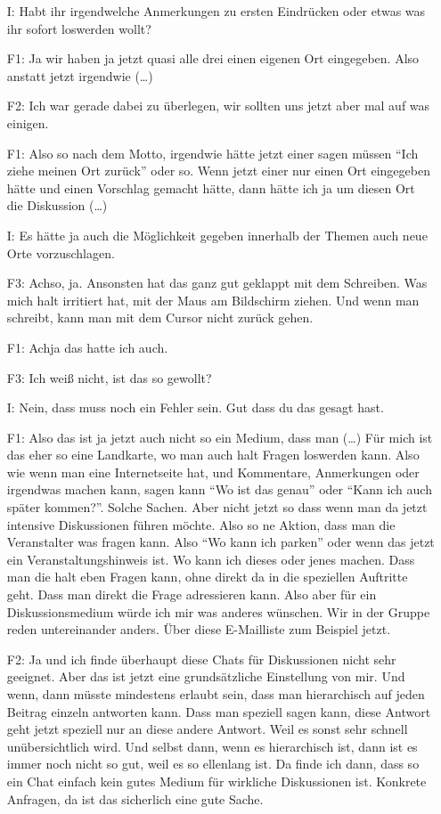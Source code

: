 \begin{itemize}
    \item[I:] Habt ihr irgendwelche Anmerkungen zu ersten Eindrücken oder etwas was ihr sofort loswerden wollt?
    \item[F1:] Ja wir haben ja jetzt quasi alle drei einen eigenen Ort eingegeben. Also anstatt jetzt irgendwie (\dots)
    \item[F2:] Ich war gerade dabei zu überlegen, wir sollten uns jetzt aber mal auf was einigen.
    \item[F1:] Also so nach dem Motto, irgendwie hätte jetzt einer sagen müssen "`Ich ziehe meinen Ort zurück"' oder so. Wenn jetzt einer nur einen Ort eingegeben hätte und einen Vorschlag gemacht hätte, dann hätte ich ja um diesen Ort die Diskussion (\dots)
    \item[I:] Es hätte ja auch die Möglichkeit gegeben innerhalb der Themen auch neue Orte vorzuschlagen.
    \item[F3:] Achso, ja. Ansonsten hat das ganz gut geklappt mit dem Schreiben. Was mich halt irritiert hat, mit der Maus am Bildschirm ziehen. Und wenn man schreibt, kann man mit dem Cursor nicht zurück gehen.
    \item[F1:] Achja das hatte ich auch.
    \item[F3:] Ich weiß nicht, ist das so gewollt?
    \item[I:] Nein, dass muss noch ein Fehler sein. Gut dass du das gesagt hast.
    \item[F1:] Also das ist ja jetzt auch nicht so ein Medium, dass man (\dots) Für mich ist das eher so eine Landkarte, wo man auch halt Fragen loswerden kann. Also wie wenn man eine Internetseite hat, und Kommentare, Anmerkungen oder irgendwas machen kann, sagen kann "`Wo ist das genau"' oder "`Kann ich auch später kommen?"'. Solche Sachen. Aber nicht jetzt so dass wenn man da jetzt intensive Diskussionen führen möchte. Also so ne Aktion, dass man die Veranstalter was fragen kann. Also "`Wo kann ich parken"' oder wenn das jetzt ein Veranstaltungshinweis ist. Wo kann ich dieses oder jenes machen. Dass man die halt eben Fragen kann, ohne direkt da in die speziellen Auftritte geht. Dass man direkt die Frage adressieren kann. Also aber für ein Diskussionsmedium würde ich mir was anderes wünschen. Wir in der Gruppe reden untereinander anders. {\"U}ber diese E-Mailliste zum Beispiel jetzt.
    \item[F2:] Ja und ich finde überhaupt diese Chats für Diskussionen nicht sehr geeignet. Aber das ist jetzt eine grundsätzliche Einstellung von mir. Und wenn, dann müsste mindestens erlaubt sein, dass man hierarchisch auf jeden Beitrag einzeln antworten kann. Dass man speziell sagen kann, diese Antwort geht jetzt speziell nur an diese andere Antwort. Weil es sonst sehr schnell unübersichtlich wird. Und selbst dann, wenn es hierarchisch ist, dann ist es immer noch nicht so gut, weil es so ellenlang ist. Da finde ich dann, dass so ein Chat einfach kein gutes Medium für wirkliche Diskussionen ist. Konkrete Anfragen, da ist das sicherlich eine gute Sache.

\end{itemize}
